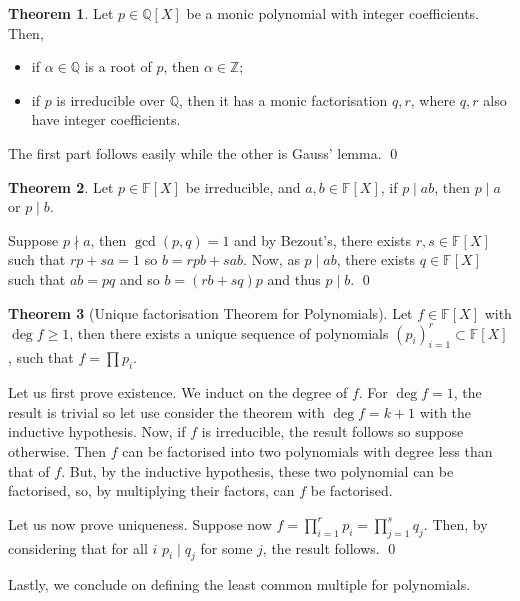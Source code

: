 \documentclass[
]{article}
\theoremstyle{definition}
\newtheorem{theorem}{Theorem}
\theoremstyle{definition}
\begin{document}
\begin{theorem}
  Let \(p \in \mathbb{Q}[X]\) be a monic polynomial with integer coefficients.
  Then, 
  \begin{itemize}
    \item if \(\alpha \in \mathbb{Q}\) is a root of \(p\), then 
      \(\alpha \in \mathbb{Z}\);
    \item if \(p\) is irreducible over \(\mathbb{Q}\), then it has a monic
      factorisation \(q, r\), where \(q, r\) also have integer coefficients. 
  \end{itemize}
\end{theorem}
\proof

The first part follows easily while the other is Gauss' lemma. \qed

\begin{theorem}
  Let \(p \in \mathbb{F}[X]\) be irreducible, and \(a, b \in \mathbb{F}[X]\), 
  if \(p \mid ab\), then \(p \mid a\) or \(p \mid b\).
\end{theorem}
\proof

Suppose \(p \nmid a\), then \(\gcd(p, q) = 1\) and by Bezout's, there
exists \(r, s \in \mathbb{F}[X]\) such that \(rp + sa = 1\) so
\(b = rpb + sab\). Now, as \(p \mid ab\), there exists
\(q \in \mathbb{F}[X]\) such that \(ab = pq\) and so \(b = (rb + sq)p\)
and thus \(p \mid b\). \qed

\begin{theorem}[Unique factorisation Theorem for Polynomials]
  Let \(f \in \mathbb{F}[X]\) with \(\deg f \ge 1\), then there exists a unique 
  sequence of polynomials \((p_i)_{i = 1}^r \subset \mathbb{F}[X]\), such that 
  \(f = \prod p_i\).
\end{theorem}
\proof

Let us first prove existence. We induct on the degree of \(f\). For
\(\deg f = 1\), the result is trivial so let use consider the theorem
with \(\deg f = k + 1\) with the inductive hypothesis. Now, if \(f\) is
irreducible, the result follows so suppose otherwise. Then \(f\) can be
factorised into two polynomials with degree less than that of \(f\).
But, by the inductive hypothesis, these two polynomial can be
factorised, so, by multiplying their factors, can \(f\) be factorised.

Let us now prove uniqueness. Suppose now
\(f = \prod_{i = 1}^r p_i =  \prod_{j = 1}^s q_j\). Then, by considering
that for all \(i\) \(p_i \mid q_j\) for some \(j\), the result follows.
\qed

Lastly, we conclude on defining the least common multiple for
polynomials.
\end{document}
